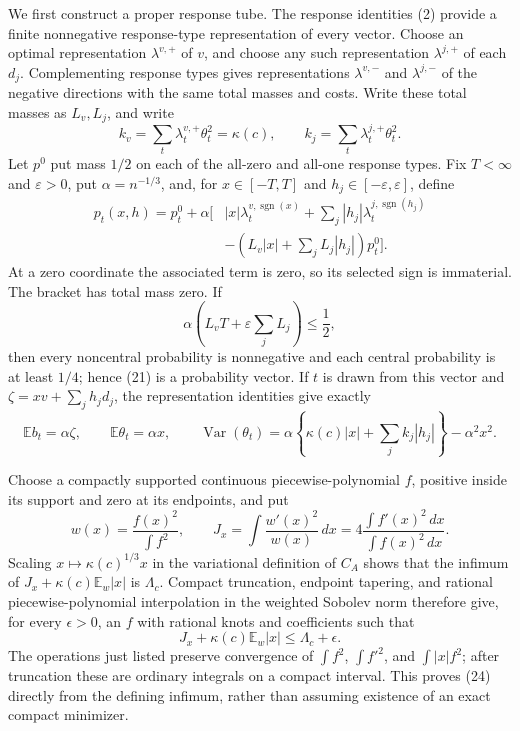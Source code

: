 We first construct a proper response tube.  The response identities (2) provide a finite nonnegative response-type representation of every vector.  Choose an optimal representation \(\lambda^{v,+}\) of \(v\), and choose any such representation \(\lambda^{j,+}\) of each \(d_j\).  Complementing response types gives representations \(\lambda^{v,-}\) and \(\lambda^{j,-}\) of the negative directions with the same total masses and costs.  Write these total masses as \(L_v,L_j\), and write
\[
k_v=\sum_t\lambda_t^{v,+}\theta_t^2=\kappa(c),
\qquad
k_j=\sum_t\lambda_t^{j,+}\theta_t^2.
\]
Let \(p^0\) put mass \(1/2\) on each of the all-zero and all-one response types.  Fix \(T<\infty\) and \(\varepsilon>0\), put \(\alpha=n^{-1/3}\), and, for \(x\in[-T,T]\) and \(h_j\in[-\varepsilon,\varepsilon]\), define
\[
\begin{split}
p_t(x,h)=p_t^0+\alpha\bigg[&|x|\lambda_t^{v,\operatorname{sgn}(x)}
+\sum_j|h_j|\lambda_t^{j,\operatorname{sgn}(h_j)}\\
&-\left(L_v|x|+\sum_jL_j|h_j|\right)p_t^0\bigg].
\end{split}
\tag{21}
\]
At a zero coordinate the associated term is zero, so its selected sign is immaterial.  The bracket has total mass zero.  If
\[
\alpha\left(L_vT+\varepsilon\sum_jL_j\right)\le\frac12,
\tag{22}
\]
then every noncentral probability is nonnegative and each central probability is at least \(1/4\); hence (21) is a probability vector.  If \(t\) is drawn from this vector and \(\zeta=xv+\sum_jh_jd_j\), the representation identities give exactly
\[
\mathbb Eb_t=\alpha\zeta,
\qquad
\mathbb E\theta_t=\alpha x,
\qquad
\operatorname{Var}(\theta_t)
=\alpha\left\{\kappa(c)|x|+\sum_jk_j|h_j|\right\}-\alpha^2x^2.
\tag{23}
\]

Choose a compactly supported continuous piecewise-polynomial \(f\), positive inside its support and zero at its endpoints, and put
\[
w(x)=\frac{f(x)^2}{\int f^2},
\qquad
J_x=\int\frac{w'(x)^2}{w(x)}\,dx
=4\frac{\int f'(x)^2\,dx}{\int f(x)^2\,dx}.
\]
Scaling \(x\mapsto\kappa(c)^{1/3}x\) in the variational definition of \(C_A\) shows that the infimum of \(J_x+\kappa(c)\mathbb E_w|x|\) is \(\Lambda_c\).  Compact truncation, endpoint tapering, and rational piecewise-polynomial interpolation in the weighted Sobolev norm therefore give, for every \(\epsilon>0\), an \(f\) with rational knots and coefficients such that
\[
J_x+\kappa(c)\mathbb E_w|x|\le\Lambda_c+\epsilon.
\tag{24}
\]
The operations just listed preserve convergence of \(\int f^2\), \(\int f'^2\), and \(\int|x|f^2\); after truncation these are ordinary integrals on a compact interval.  This proves (24) directly from the defining infimum, rather than assuming existence of an exact compact minimizer.

